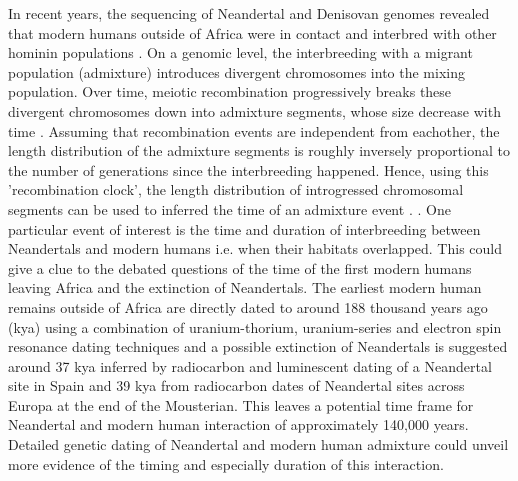 \documentclass[]{article}
\begin{document}
In recent years, the sequencing of Neandertal \citep{green_draft_2010,prufer_complete_2013,prufer_high-coverage_2017, mafessoni_high_coverage_2020} and Denisovan genomes \citep{reich_genetic_2010, meyer_high-coverage_2012} revealed that modern humans outside of Africa were in contact and interbred with other hominin populations \citep{vernot_resurrecting_2014,fu_early_2015,fu_genome_2014,sankararaman_genomic_2014,sankararaman_combined_2016,vernot_excavating_2016,malaspinas_genomic_2016}. On a genomic level, the interbreeding with a migrant population (admixture) introduces divergent chromosomes into the mixing population. Over time, meiotic recombination progressively breaks these divergent chromosomes down into admixture segments, whose size decrease with time \citep{falush_inference_2003}. Assuming that recombination events are independent from eachother, the length distribution of the admixture segments is roughly inversely proportional to the number of generations since the interbreeding happened. Hence, using this 'recombination clock', the length distribution of introgressed chromosomal segments can be used to inferred the time of an
admixture event \citep{moorjani_history_2011,pugach_dating_2011,sankararaman_date_2012,loh_inferring_2013,sankararaman_combined_2016,pugach_gateway_2018,jacobs_multiple_2019,hellenthal_genetic_2014}. \citep{pool_inference_2009,moorjani_history_2011,gravel_population_2012,liang_lengths_2014}. One particular event of interest is the time and duration of interbreeding between Neandertals and modern humans i.e. when their habitats overlapped.  This could give a clue to the debated questions of the time of the first modern humans leaving Africa and the extinction of Neandertals. The earliest modern human remains outside of Africa are directly dated to around 188 thousand years ago (kya)  using a combination of uranium-thorium, uranium-series and electron spin resonance dating techniques  \citep{stringer_when_2018,hershkovitz_earliest_2018} and a possible extinction of Neandertals is suggested around 37 kya inferred by radiocarbon and luminescent dating of a Neandertal site in Spain \citep{zilhao_precise_2017} and 39 kya from radiocarbon dates of Neandertal sites across Europa \citep{higham_timing_2014} at the end of the Mousterian. This leaves a potential time frame for Neandertal and modern human interaction of approximately 140,000 years. Detailed genetic dating of Neandertal and modern human admixture could unveil more evidence of the timing and especially duration of this interaction. 
\end{document}
